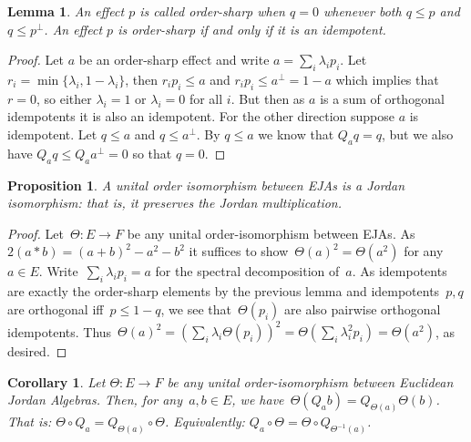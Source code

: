 \documentclass[submission,copyright,creativecommons]{eptcs}
\newcounter{main}
\newtheorem{proposition}[main]{Proposition}
\newtheorem{lemma}[main]{Lemma}
\newtheorem{corollary}[main]{Corollary}
\theoremstyle{definition}
\begin{document}
\begin{lemma}\label{ordersharpprop}
    An effect $p$ is called \emph{order-sharp} when $q=0$ whenever both $q\leq p$ and $q\leq p^\perp$. An effect $p$ is order-sharp if and only if it is an idempotent.
\end{lemma}
\begin{proof}
    Let $a$ be an order-sharp effect and write $a=\sum_i \lambda_i p_i$. Let $r_i=\min\{\lambda_i,1-\lambda_i\}$, then $r_ip_i\leq a$ and $r_ip_i\leq a^\perp=1-a$ which implies that $r=0$, so either $\lambda_i=1$ or $\lambda_i=0$ for all $i$. But then as $a$ is a sum of orthogonal idempotents it is also an idempotent. For the other direction suppose $a$ is idempotent. Let $q\leq a$ and $q\leq a^\perp$. By $q\leq a$ we know that $Q_a q = q$, but we also have $Q_a q \leq Q_a a^\perp = 0$ so that $q=0$.
\end{proof}
\begin{proposition}
	A unital order isomorphism between EJAs is a Jordan isomorphism: that is, it preserves the Jordan multiplication.
\end{proposition}
\begin{proof}
Let~$\Theta\colon E \to F$ be any unital order-isomorphism
    between EJAs.
    As~$2(a * b) = (a+b)^2 - a^2 - b^2$
        it suffices to show~$\Theta(a)^2= \Theta(a^2)$ for any~$a \in E$.
Write~$\sum_i \lambda_i p_i = a$ for the spectral decomposition of~$a$.
As idempotents are exactly the order-sharp elements by the previous lemma
    and idempotents~$p,q$ are orthogonal iff~$p \leq 1-q$,
    we see that~$\Theta(p_i)$ are also pairwise orthogonal idempotents.
    Thus~$\Theta(a)^2 = (\sum_i \lambda_i \Theta(p_i))^2 = \Theta(\sum_i \lambda_i^2 p_i) = \Theta(a^2)$,
        as desired.
\end{proof}
\begin{corollary}
	Let $\Theta:E\rightarrow F$ be any unital order-isomorphism between Euclidean
        Jordan Algebras.
    Then, for any~$a,b\in E$, we have~$\Theta(Q_ab) = Q_{\Theta(a)}\Theta(b)$.
    That is: $\Theta\circ Q_a = Q_{\Theta(a)}\circ \Theta$.
    Equivalently: $Q_a\circ \Theta = \Theta \circ Q_{\Theta^{-1}(a)}$.
\end{corollary}
\end{document}
